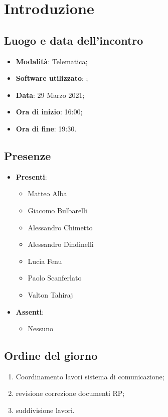 \documentclass[]{article}
\begin{document}
	

	\newpage


		\section{Introduzione}
		\subsection{Luogo e data dell'incontro}
		\begin{itemize}
			\item \textbf{Modalità}: Telematica;
			\item \textbf{Software utilizzato}: ;
			\item \textbf{Data}: 29 Marzo 2021;
			\item \textbf{Ora di inizio}: 16:00;
			\item \textbf{Ora di fine}: 19:30.
		\end{itemize}

		\subsection{Presenze}
		\begin{itemize}
			\item \textbf{Presenti}:
			\begin{itemize}
				\item Matteo Alba
				\item Giacomo Bulbarelli
				\item Alessandro Chimetto
				\item Alessandro Dindinelli
				\item Lucia Fenu
				\item Paolo Scanferlato
				\item Valton Tahiraj
			\end{itemize}
			\item \textbf{Assenti}:
			\begin{itemize}
				\item Nessuno
			\end{itemize}
		\end{itemize}


		\subsection{Ordine del giorno}
		\begin{enumerate}
			\item Coordinamento lavori sistema di comunicazione;
			\item revisione correzione documenti RP;
			\item suddivisione lavori.
		\end{enumerate}
\end{document}
